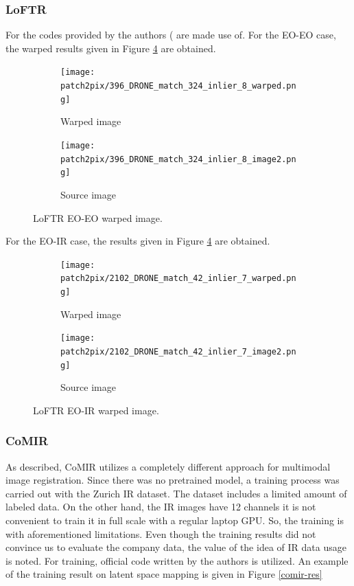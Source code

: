 \documentclass[letterpaper,12pt]{article}
\begin{document}
\subsubsection{LoFTR}
For \cite{sun2021loftr} the codes provided by the authors (\cite{loftrcode} are made use of. For the EO-EO case, the warped results given in Figure \ref{fig:eo-ir-loftr-warped} are obtained.

\begin{figure}[H]
    \centering
    \begin{subfigure}{.4\textwidth}

    \texttt{[image: patch2pix/396\_DRONE\_match\_324\_inlier\_8\_warped.png]}
    \caption{Warped image}
    \label{fig:eo-eo-loftr-warped}
    \end{subfigure}
    \begin{subfigure}{.4\textwidth}
    \texttt{[image: patch2pix/396\_DRONE\_match\_324\_inlier\_8\_image2.png]}
    
    \caption{Source image}
    \label{fig:eo-eo-loftr-warped_0}
    \end{subfigure}
    \caption{LoFTR EO-EO warped image.}
\end{figure} 
For the EO-IR case, the results given in Figure \ref{fig:eo-ir-loftr-warped} are obtained. 

\begin{figure}[H]
    \centering
    \begin{subfigure}{.4\textwidth}

    \texttt{[image: patch2pix/2102\_DRONE\_match\_42\_inlier\_7\_warped.png]}
    \caption{Warped image}
    \label{fig:eo-ir-loftr-warped}
    \end{subfigure}
    \begin{subfigure}{.4\textwidth}
    \texttt{[image: patch2pix/2102\_DRONE\_match\_42\_inlier\_7\_image2.png]}
    
    \caption{Source image}
    \label{fig:eo-ir-loftr-warped_0}
    \end{subfigure}
    \caption{LoFTR EO-IR warped image.}
\end{figure} 


\subsubsection{CoMIR}
As described, CoMIR \cite{pielawski2020comir} utilizes a completely different approach for multimodal image registration. Since there was no pretrained model, a training process was carried out with the Zurich IR dataset. The dataset includes a limited amount of labeled data. On the other hand, the IR images have 12 channels it is not convenient to train it in full scale with a regular laptop GPU. So, the training is with aforementioned limitations. Even though the training results did not convince us to evaluate the company data, the value of the idea of IR data usage is noted. For training, official code written by the authors \cite{comircode} is utilized. An example of the training result on latent space mapping is given in Figure \ref{comir-res}
\end{document}
